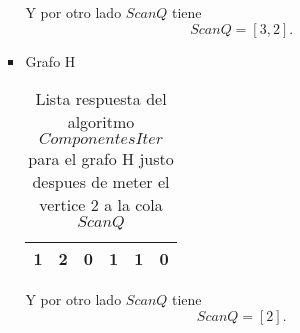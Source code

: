 \begin{enumerate}
\begin{enumerate}
\begin{itemize}
		Y por otro lado $ScanQ$ tiene \[
		  ScanQ = \left[ 3,2 \right] 
		.\] 
	      \item Grafo H
		\begin{table}[H]
		  \centering
		  \caption{Lista respuesta del algoritmo $ComponentesIter$ para el grafo H justo despues de meter el vertice $2$ a la cola $ScanQ$}
		  \label{tab:l1}
		  \begin{tabular}{|c|c|c|c|c|c|}
		    \hline
		    1 & 2 & 0 & 1 & 1 & 0\\
		    \hline
		  \end{tabular}
		\end{table}
		Y por otro lado $ScanQ$ tiene \[
		  ScanQ = \left[ 2 \right] 
		.\] 
	    \end{itemize}
	\end{enumerate}
    \end{enumerate}

